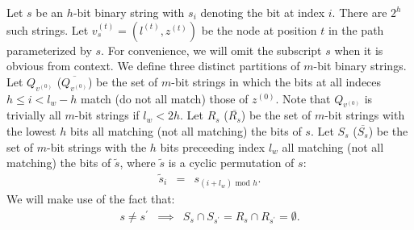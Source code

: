\documentclass{sig-alternate-05-2015}
\newcommand{\beq}{\begin{eqnarray}}
\newcommand{\eeq}{\end{eqnarray}}
\begin{document}
Let $s$ be an $h$-bit binary string with $s_i$ denoting the bit at index $i$.
There are $2^h$ such strings.
Let $v_s^{(t)} = (l^{(t)}, z^{(t)})$ be the node at position $t$
in the path parameterized by $s$.
For convenience,
we will omit the subscript $s$ when it is obvious from context.
We define three distinct partitions of $m$-bit binary strings.
Let $Q_{v^{(0)}}$ ($\overline{Q_{v^{(0)}}}$) be the set of $m$-bit
strings in which the bits at
all indeces $h \leq i < l_w - h$ match (do not all match) those of $z^{(0)}$.
Note that $Q_{v^{(0)}}$ is trivially all $m$-bit strings if $l_w < 2h$.
Let $R_s$ ($\overline{R_s}$) be the set of $m$-bit strings with the lowest $h$
bits all matching (not all matching) the bits of $s$.
Let $S_s$ ($\overline{S_s}$) be the set of $m$-bit strings with the $h$ bits
preceeding index $l_w$ all matching (not all matching) the bits of $\tilde{s}$,
where $\tilde{s}$ is a cyclic permutation of $s$:
\beq
\tilde{s}_i &=& s_{(i + l_w) \text{ mod } h}.
\eeq
We will make use of the fact that:
\beq
s \neq s^\prime &\implies&
S_s \cap S_{s^\prime} = R_s \cap R_{s^\prime} = \emptyset.
\eeq
\end{document}
